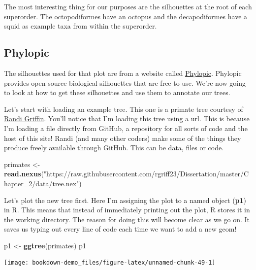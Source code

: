 \documentclass[
]{book}
\newenvironment{Shaded}{\begin{snugshade}}{\end{snugshade}}
\newcommand{\KeywordTok}[1]{\textcolor[rgb]{0.13,0.29,0.53}{\textbf{#1}}}
\newcommand{\NormalTok}[1]{#1}
\newcommand{\StringTok}[1]{\textcolor[rgb]{0.31,0.60,0.02}{#1}}
\begin{document}
The most interesting thing for our purposes are the silhouettes at the root of each superorder. The octopodiformes have an octopus and the decapodiformes have a squid as example taxa from within the superorder.

\hypertarget{phylopic}{%
\subsection{Phylopic}\label{phylopic}}

The silhouettes used for that plot are from a website called \href{http://phylopic.org/}{Phylopic}. Phylopic provides open source biological silhouettes that are free to use. We're now going to look at how to get these silhouettes and use them to annotate our trees.

Let's start with loading an example tree. This one is a primate tree courtesy of \href{https://www.randigriffin.com/}{Randi Griffin}. You'll notice that I'm loading this tree using a url. This is because I'm loading a file directly from GitHub, a repository for all sorts of code and the host of this site! Randi (and many other coders) make some of the things they produce freely available through GitHub. This can be data, files or code.

\begin{Shaded}
\begin{Highlighting}[]
\NormalTok{primates \textless{}{-}}\StringTok{ }\KeywordTok{read.nexus}\NormalTok{(}\StringTok{"https://raw.githubusercontent.com/rgriff23/Dissertation/master/Chapter\_2/data/tree.nex"}\NormalTok{)}
\end{Highlighting}
\end{Shaded}

Let's plot the new tree first. Here I'm assigning the plot to a named object (\textbf{p1}) in R. This means that instead of immediately printing out the plot, R stores it in the working directory. The reason for doing this will become clear as we go on. It saves us typing out every line of code each time we want to add a new geom!

\begin{Shaded}
\begin{Highlighting}[]
\NormalTok{p1 \textless{}{-}}\StringTok{ }\KeywordTok{ggtree}\NormalTok{(primates)}
\NormalTok{p1}
\end{Highlighting}
\end{Shaded}

\begin{center}\texttt{[image: bookdown-demo\_files/figure-latex/unnamed-chunk-49-1]} \end{center}
\end{document}
